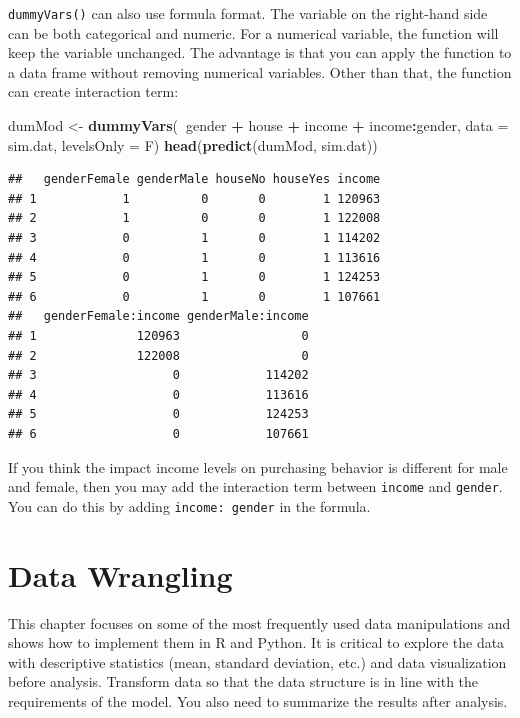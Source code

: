 \documentclass[12pt,]{krantz}
\makeatletter
\newenvironment{Shaded}{\begin{snugshade}}{\end{snugshade}}
\newcommand{\DataTypeTok}[1]{\textcolor[rgb]{0.27,0.27,0.27}{#1}}
\newcommand{\KeywordTok}[1]{\textcolor[rgb]{0.27,0.27,0.27}{\textbf{#1}}}
\newcommand{\NormalTok}[1]{#1}
\newcommand{\OperatorTok}[1]{\textcolor[rgb]{0.43,0.43,0.43}{\textbf{#1}}}
\newcommand{\StringTok}[1]{\textcolor[rgb]{0.5,0.5,0.5}{#1}}
\newenvironment{kframe}{%
\medskip{}
\setlength{\fboxsep}{.8em}
 \def\at@end@of@kframe{}%
 \ifinner\ifhmode%
  \def\at@end@of@kframe{\end{minipage}}%
  \begin{minipage}{\columnwidth}%
 \fi\fi%
 \def\FrameCommand##1{\hskip\@totalleftmargin \hskip-\fboxsep
 \colorbox{shadecolor}{##1}\hskip-\fboxsep
     \hskip-\linewidth \hskip-\@totalleftmargin \hskip\columnwidth}%
 \MakeFramed {\advance\hsize-\width
   \@totalleftmargin\z@ \linewidth\hsize
   \@setminipage}}%
 {\par\unskip\endMakeFramed%
 \at@end@of@kframe}
\renewenvironment{Shaded}{\begin{kframe}}{\end{kframe}}
\makeatother
\begin{document}
\texttt{dummyVars()} can also use formula format. The variable on the right-hand side can be both categorical and numeric. For a numerical variable, the function will keep the variable unchanged. The advantage is that you can apply the function to a data frame without removing numerical variables. Other than that, the function can create interaction term:

\begin{Shaded}
\begin{Highlighting}[]
\NormalTok{dumMod <-}\StringTok{ }\KeywordTok{dummyVars}\NormalTok{(}\OperatorTok{~}\NormalTok{gender }\OperatorTok{+}\StringTok{ }\NormalTok{house }\OperatorTok{+}\StringTok{ }\NormalTok{income }\OperatorTok{+}\StringTok{ }\NormalTok{income}\OperatorTok{:}\NormalTok{gender, }
                    \DataTypeTok{data =}\NormalTok{ sim.dat, }
                    \DataTypeTok{levelsOnly =}\NormalTok{ F)}
\KeywordTok{head}\NormalTok{(}\KeywordTok{predict}\NormalTok{(dumMod, sim.dat))}
\end{Highlighting}
\end{Shaded}

\begin{verbatim}
##   genderFemale genderMale houseNo houseYes income
## 1            1          0       0        1 120963
## 2            1          0       0        1 122008
## 3            0          1       0        1 114202
## 4            0          1       0        1 113616
## 5            0          1       0        1 124253
## 6            0          1       0        1 107661
##   genderFemale:income genderMale:income
## 1              120963                 0
## 2              122008                 0
## 3                   0            114202
## 4                   0            113616
## 5                   0            124253
## 6                   0            107661
\end{verbatim}

If you think the impact income levels on purchasing behavior is different for male and female, then you may add the interaction term between \texttt{income} and \texttt{gender}. You can do this by adding \texttt{income:\ gender} in the formula.

\hypertarget{datawrangline}{%
\chapter{Data Wrangling}\label{datawrangline}}

This chapter focuses on some of the most frequently used data manipulations and shows how to implement them in R and Python. It is critical to explore the data with descriptive statistics (mean, standard deviation, etc.) and data visualization before analysis. Transform data so that the data structure is in line with the requirements of the model. You also need to summarize the results after analysis.
\end{document}
